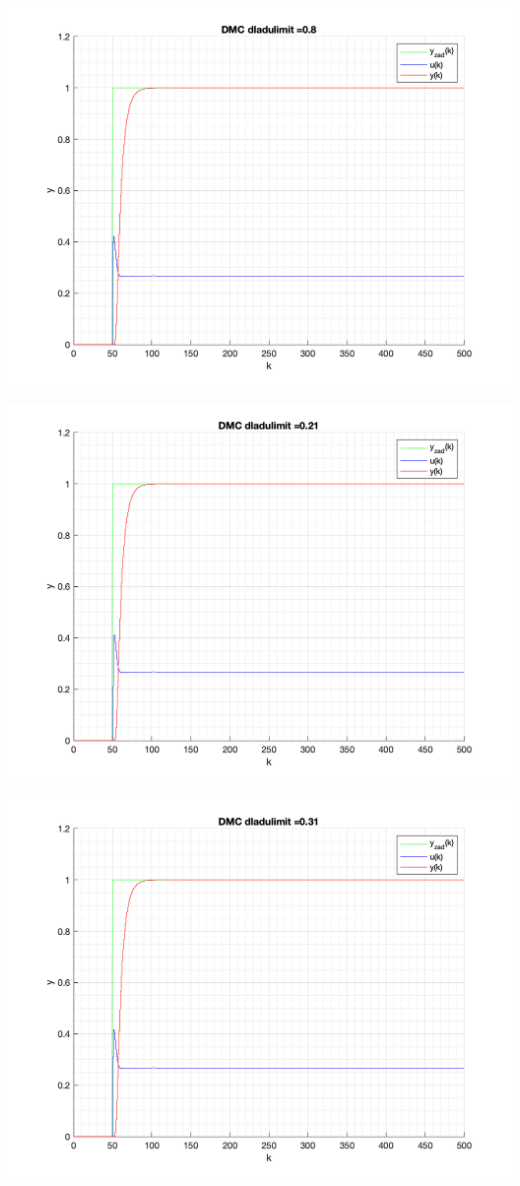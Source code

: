 \documentclass[a4paper, 11pt]{article}
\begin{document}
\begin{enumerate}
 \includegraphics[width=\linewidth]{./ModelsP6_dulimit/P4_DMC_dulimit_0_8_png.png} 
 
 \includegraphics[width=\linewidth]{./ModelsP6_dulimit/P4_DMC_dulimit_0_21_png.png} 
 
 \includegraphics[width=\linewidth]{./ModelsP6_dulimit/P4_DMC_dulimit_0_31_png.png} 
 

\end{enumerate}
\end{document}
